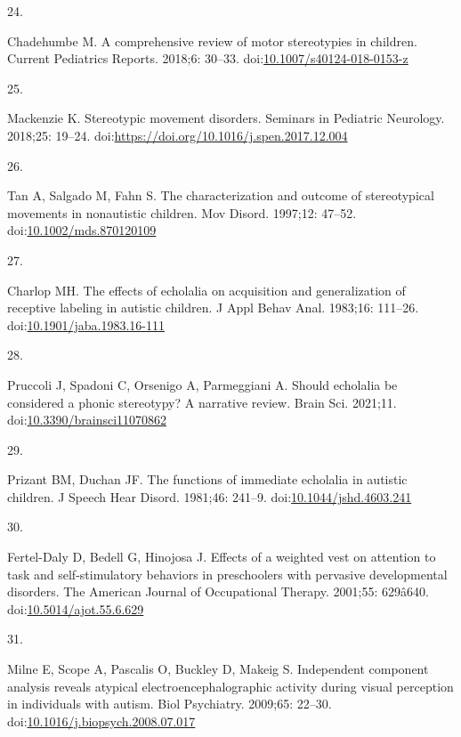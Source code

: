 \documentclass[
  letterpaper,
  DIV=11,
  numbers=noendperiod]{scrartcl}
\newlength{\cslhangindent}
\newlength{\csllabelwidth}
\newenvironment{CSLReferences}[2] %
 {\begin{list}{}{%
  \setlength{\itemindent}{0pt}
  \setlength{\leftmargin}{0pt}
  \setlength{\parsep}{0pt}
  \ifodd #1
   \setlength{\leftmargin}{\cslhangindent}
   \setlength{\itemindent}{-1\cslhangindent}
  \fi
  \setlength{\itemsep}{#2\baselineskip}}}
 {\end{list}}
\newcommand{\CSLLeftMargin}[1]{\parbox[t]{\csllabelwidth}{\strut#1\strut}}
\newcommand{\CSLRightInline}[1]{\parbox[t]{\linewidth - \csllabelwidth}{\strut#1\strut}}
\begin{document}
\begin{CSLReferences}{0}{1}
\CSLLeftMargin{24. }%
\CSLRightInline{Chadehumbe M. A comprehensive review of motor
stereotypies in children. Current Pediatrics Reports. 2018;6: 30--33.
doi:\href{https://doi.org/10.1007/s40124-018-0153-z}{10.1007/s40124-018-0153-z}}

\CSLLeftMargin{25. }%
\CSLRightInline{Mackenzie K. Stereotypic movement disorders. Seminars in
Pediatric Neurology. 2018;25: 19--24.
doi:\url{https://doi.org/10.1016/j.spen.2017.12.004}}

\CSLLeftMargin{26. }%
\CSLRightInline{Tan A, Salgado M, Fahn S. The characterization and
outcome of stereotypical movements in nonautistic children. Mov Disord.
1997;12: 47--52.
doi:\href{https://doi.org/10.1002/mds.870120109}{10.1002/mds.870120109}}

\CSLLeftMargin{27. }%
\CSLRightInline{Charlop MH. The effects of echolalia on acquisition and
generalization of receptive labeling in autistic children. J Appl Behav
Anal. 1983;16: 111--26.
doi:\href{https://doi.org/10.1901/jaba.1983.16-111}{10.1901/jaba.1983.16-111}}

\CSLLeftMargin{28. }%
\CSLRightInline{Pruccoli J, Spadoni C, Orsenigo A, Parmeggiani A. Should
echolalia be considered a phonic stereotypy? A narrative review. Brain
Sci. 2021;11.
doi:\href{https://doi.org/10.3390/brainsci11070862}{10.3390/brainsci11070862}}

\CSLLeftMargin{29. }%
\CSLRightInline{Prizant BM, Duchan JF. The functions of immediate
echolalia in autistic children. J Speech Hear Disord. 1981;46: 241--9.
doi:\href{https://doi.org/10.1044/jshd.4603.241}{10.1044/jshd.4603.241}}

\CSLLeftMargin{30. }%
\CSLRightInline{Fertel-Daly D, Bedell G, Hinojosa J. Effects of a
weighted vest on attention to task and self-stimulatory behaviors in
preschoolers with pervasive developmental disorders. The American
Journal of Occupational Therapy. 2001;55: 629â640.
doi:\href{https://doi.org/10.5014/ajot.55.6.629}{10.5014/ajot.55.6.629}}

\CSLLeftMargin{31. }%
\CSLRightInline{Milne E, Scope A, Pascalis O, Buckley D, Makeig S.
Independent component analysis reveals atypical electroencephalographic
activity during visual perception in individuals with autism. Biol
Psychiatry. 2009;65: 22--30.
doi:\href{https://doi.org/10.1016/j.biopsych.2008.07.017}{10.1016/j.biopsych.2008.07.017}}


\end{CSLReferences}
\end{document}
